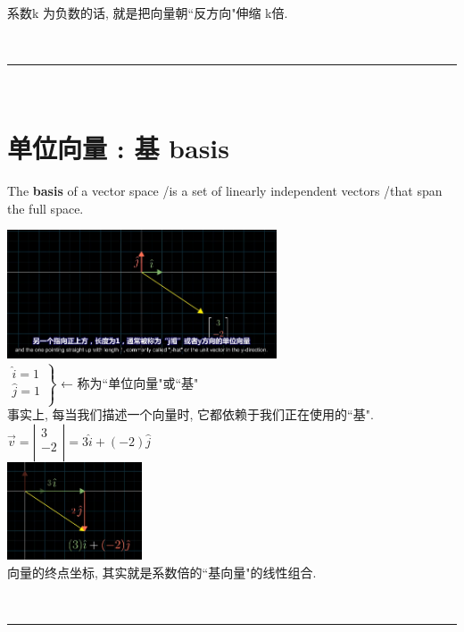 \documentclass[UTF8]{ctexart}
\begin{document}
	系数k 为负数的话, 就是把向量朝``反方向"伸缩 k倍.
		
	~\\
	\hrule
	~\\
	
	\section{单位向量 : 基 basis}
	
	The \textbf{basis} of a vector space /is a set of linearly independent vectors /that span the full space.
	
	\includegraphics[width=0.6\textwidth]{img/0068.png}\\	
	
	$\left. \begin{array}{r}
		\hat{i} = 1\\
		\hat{j} = 1\\
	\end{array} \right\}$ ← 称为``单位向量"或``基"\\

事实上, 每当我们描述一个向量时, 它都依赖于我们正在使用的``基".\\

$\vec{v}=\left| \begin{array}{l}
	3\\
	-2\\
\end{array} \right|= 3 \hat{i} + (-2)\hat{j}$\\

	\includegraphics[width=0.3\textwidth]{img/0069.png}\\		
	
	向量的终点坐标, 其实就是系数倍的``基向量"的线性组合.
	
	~\\
	\hrule
	~\\
	
\end{document}
